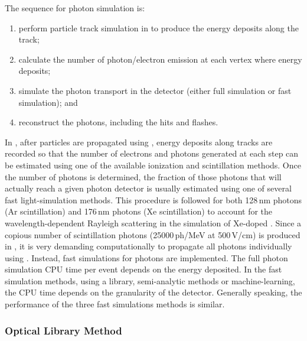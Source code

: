 \documentclass[../main-v1.tex]{subfiles}
\begin{document}
The sequence for photon simulation is:
\begin{enumerate}
\item perform particle track simulation in  to produce the energy deposits along the track;
\item  calculate the number of photon/electron emission at each vertex where energy deposits; \item 
simulate the photon transport in the detector (either full simulation or fast simulation); and
\item  reconstruct the photons, including the hits and flashes. %
\end{enumerate}
 
In , after particles are propagated using , energy deposits along tracks are recorded so that the number of electrons and photons generated at each step can be estimated using one of the available  ionization and scintillation methods. Once the number of photons is determined, the fraction of those photons that will actually reach a given photon detector is usually estimated using one of several fast light-simulation methods. This procedure is followed for both 128\,nm photons (Ar scintillation) and 176\,nm photons (Xe scintillation) to account for the wavelength-dependent Rayleigh scattering in the simulation of Xe-doped . 
Since a copious number of scintillation photons (25000\,ph/MeV at 500\,V/cm) is produced in , it is very demanding computationally to propagate all photons individually using . Instead,  fast simulations for photons are implemented.
The full   photon simulation CPU time per event depends on the energy deposited. 
In the fast simulation methods, using a library,  semi-analytic methods or machine-learning, the CPU time depends on the granularity of the detector. Generally speaking, the performance of the three fast simulations methods is similar. %
 
\subsubsection{Optical Library Method}
\end{document}
